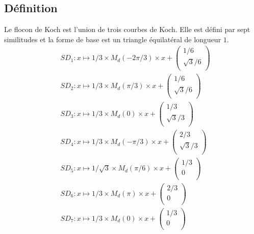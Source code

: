 \documentclass[a4paper, 12pt]{report}
\begin{document}
			\subsection{Définition}
				Le flocon de Koch est l'union de trois courbes de Koch. Elle est défini par sept similitudes et la forme de base est un triangle équilatéral de longueur $1$.
				\begin{align*}
					&SD_1:x\mapsto 1/3\times M_d(-2\pi/3)\times x+\left(	\begin{array}{ccc}
															1/6\\
															\sqrt{3}/6\\
														\end{array}\right)\\
					&SD_2:x\mapsto 1/3\times M_d(\pi/3)\times x+\left(	\begin{array}{ccc}
															1/6\\
															\sqrt{3}/6\\
														\end{array}\right)\\
					&SD_3:x\mapsto 1/3\times M_d(0)\times x+\left(	\begin{array}{ccc}
															1/3\\
															\sqrt{3}/3\\
														\end{array}\right)\\
					&SD_4:x\mapsto 1/3\times M_d(-\pi/3)\times x+\left(	\begin{array}{ccc}
															2/3\\
															\sqrt{3}/3\\
														\end{array}\right)\\
					&SD_5:x\mapsto 1/\sqrt{3}\times M_d(\pi/6)\times x+\left(	\begin{array}{ccc}
															1/3\\
															0\\
														\end{array}\right)\\
					&SD_6:x\mapsto 1/3\times M_d(\pi)\times x+\left(	\begin{array}{ccc}
															2/3\\
															0\\
														\end{array}\right)\\
					&SD_7:x\mapsto 1/3\times M_d(0)\times x+\left(	\begin{array}{ccc}
															1/3\\
															0\\
														\end{array}\right)
				\end{align*}
\end{document}
